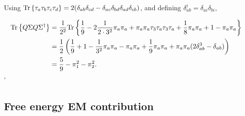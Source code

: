 \documentclass{book}
\begin{document}
Using $
\text{Tr} \left\{ \tau_a \tau_b \tau_c \tau_d \right\} = 2 (\delta_{ab}\delta_{cd}
 - \delta_{ac}\delta_{bd}
 \delta_{ad}\delta_{cb})
$, and defining $\delta_{ab}^i = \delta_{ai}\delta_{bi}$,

\begin{align}
    \text{Tr} \left\{ Q \Sigma Q \Sigma^\dagger \right\}
    & =
    \frac{1}{2^2}
    \text{Tr} \left\{ 
        \frac{1}{9}
        - 2 \frac{1}{2\cdot 3^2} \pi_a \pi_a
        + \pi_a \pi_a \tau_3 \tau_a\tau_3 \tau_a
        + \frac{1}{8} \pi_a \pi_a
        + 1
        - \pi_a\pi_a
     \right\} \\
    & = 
    \frac{1}{2}
    \left(
        \frac{1}{9}
        + 1
        - \frac{1}{3^2} \pi_a \pi_a
        - \pi_a \pi_a
        + \frac{1}{9} \pi_a \pi_a
        + \pi_a \pi_a(2 \delta_{ab}^3 - \delta_{ab})
    \right) \\
    &
    = \frac{5}{9} - \pi_1^2 - \pi_2^2.
\end{align}'

\subsection{Free energy EM contribution}
\end{document}
